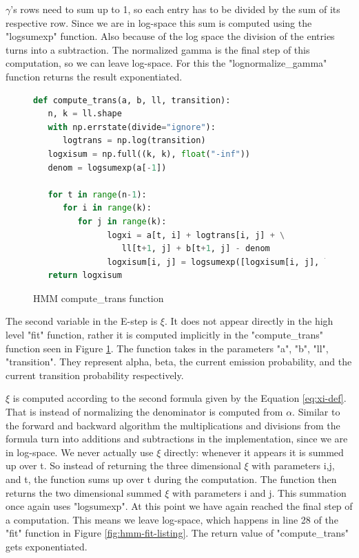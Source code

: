 $\gamma$'s rows need to sum up to 1, so each entry has to be divided by the sum of its respective row. Since we are in log-space this sum is computed using the "logsumexp" function. Also because of the log space the division of the entries turns into a subtraction. The normalized gamma is the final step of this computation, so we can leave log-space. For this the "lognormalize\_gamma" function returns the result exponentiated. 

\begin{figure}
\begin{singlespace}
\begin{lstlisting}[language=Python]
def compute_trans(a, b, ll, transition):
   n, k = ll.shape
   with np.errstate(divide="ignore"):
      logtrans = np.log(transition)
   logxisum = np.full((k, k), float("-inf"))
   denom = logsumexp(a[-1])

   for t in range(n-1):
      for i in range(k):
         for j in range(k):
               logxi = a[t, i] + logtrans[i, j] + \
                  ll[t+1, j] + b[t+1, j] - denom
               logxisum[i, j] = logsumexp([logxisum[i, j], logxi])
   return logxisum
\end{lstlisting}
\end{singlespace}
\caption{HMM compute\_trans function}    
\label{fig:hmm-computetrans-listing}
\end{figure}

The second variable in the E-step is $\xi$. It does not appear directly in the high level "fit" function, rather it is computed implicitly in the "compute\_trans" function seen in Figure \ref{fig:hmm-computetrans-listing}. The function takes in the parameters "a", "b", "ll", "transition". They represent alpha, beta, the current emission probability, and the current transition probability respectively. 

$\xi$ is computed according to the second formula given by the Equation \eqref{eq:xi-def}. That is instead of normalizing the denominator is computed from $\alpha$. Similar to the forward and backward algorithm the multiplications and divisions from the formula turn into additions and subtractions in the implementation, since we are in log-space. We never actually use $\xi$ directly: whenever it appears it is summed up over t. So instead of returning the three dimensional $\xi$ with parameters i,j, and t, the function sums up over t during the computation. The function then returns the two dimensional summed $\xi$ with parameters i and j. This summation once again uses "logsumexp". At this point we have again reached the final step of a computation. This means we leave log-space, which happens in line 28 of the "fit" function in Figure \ref{fig:hmm-fit-listing}. The return value of "compute\_trans" gets exponentiated. 

